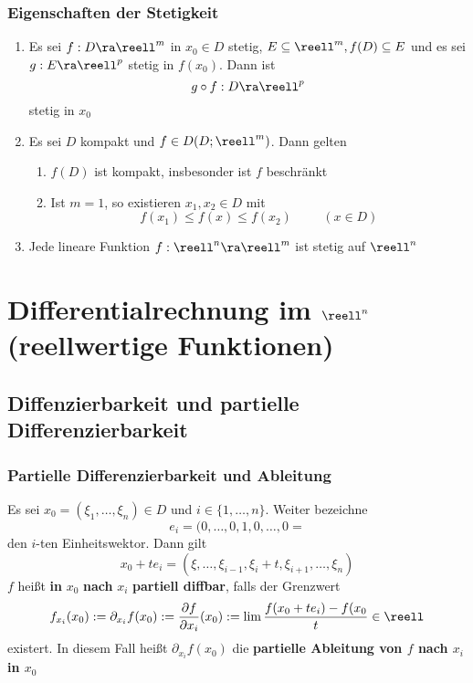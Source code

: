 \documentclass{kit}
\begin{document}
    \subsubsection{Eigenschaften der Stetigkeit}
      \begin{enumerate}
        \item Es sei $f:D\ra\reell^m$ in $x_0\in D$ stetig, $E\subseteq\reell^m,f(D)\subseteq E$ und es sei $g:E\ra\reell^p$
          stetig in $f(x_0)$. Dann ist
          $$g\circ f:D\ra\reell^p$$
          stetig in $x_0$
        \item Es sei $D$ kompakt und $f\in D(D;\reell^m)$. Dann gelten
          \begin{enumerate}[label=\roman*)]
            \item $f(D)$ ist kompakt, insbesonder ist $f$ beschränkt
            \item Ist $m=1$, so existieren $x_1,x_2\in D$ mit
              $$f(x_1)\le f(x)\le f(x_2)\hspace{1cm}(x\in D)$$
          \end{enumerate}
        \item Jede lineare Funktion $f:\reell^n\ra\reell^m$ ist stetig auf $\reell^n$
      \end{enumerate}
      \section{Differentialrechnung im \texorpdfstring{$\reell^n$}{}\footnotesize{(reellwertige Funktionen)}}
  \subsection{Diffenzierbarkeit und partielle Differenzierbarkeit}
    \subsubsection{Partielle Differenzierbarkeit und  Ableitung}
      Es sei $x_0=(\xi_1,\dots,\xi_n)\in D$ und $i\in\{1,\dots,n\}$. Weiter bezeichne
      $$e_i=(0,\dots,0,1,0,\dots,0=$$
      den $i$-ten Einheitswektor. Dann gilt
      $$x_0+te_i=(\xi,\dots,\xi_{i-1},\xi_i+t,\xi_{i+1},\dots,\xi_n)$$
      $f$ heißt \textbf{in} $x_0$ \textbf{nach} $x_i$ \textbf{partiell diffbar}, falls der Grenzwert
      $$f_{x_i}(x_0):=\partial_{x_i}f(x_0):=\frac{\partial f}{\partial x_i}(x_0):=\lim\frac{f(x_0+te_i)-f(x_0}{t}\in\reell$$
      existert. In diesem Fall heißt $\partial_{x_i}f(x_0)$ die \textbf{partielle Ableitung von $f$ nach $x_i$ in $x_0$}
\end{document}
